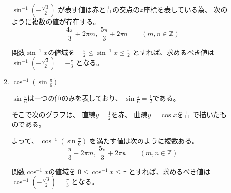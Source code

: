 \documentclass[12pt,b5paper]{ltjsarticle}
\begin{document}
\begin{enumerate}
\begin{enumerate}
            $\displaystyle \sin^{-1}{\left( -\frac{\sqrt{3}}{2} \right)}$
            が表す値は赤と青の交点の$x$座標を表している為、
            次のように複数の値が存在する。
            \begin{equation}
             \frac{4\pi}{3} + 2\pi m, \  \frac{5\pi}{3} + 2\pi n
              \qquad \left( m,n \in \mathbb{Z} \right)
            \end{equation}

            関数$\sin^{-1}{x}$の値域を
            $-\frac{\pi}{2} \leq \sin^{-1}{x} \leq \frac{\pi}{2}$
            とすれば、求めるべき値は
            $\sin^{-1}{\left( -\frac{\sqrt{3}}{2} \right)}=-\frac{\pi}{3}$
            となる。


            \hrulefill

       \item
            $\displaystyle \cos^{-1}{\left( \sin{\frac{\pi}{6}} \right)}$

            \dotfill

            $\displaystyle \sin{\frac{\pi}{6}}$は一つの値のみを表しており、
            $\displaystyle \sin{\frac{\pi}{6}}=\frac{1}{2}$である。

            そこで次のグラフは、
            直線$y=\frac{1}{2}$を赤、
            曲線$y=\cos{x}$を青
            で描いたものである。


            よって、
            $\displaystyle \cos^{-1}{\left( \sin{\frac{\pi}{6}} \right)}$
            を満たす値は次のように複数ある。
            \begin{equation}
             \frac{\pi}{3} + 2\pi m, \  \frac{5\pi}{3} + 2\pi n
              \qquad \left( m,n \in \mathbb{Z} \right)
            \end{equation}

            関数$\cos^{-1}{x}$の値域を
            $0 \leq \cos^{-1}{x} \leq \pi$
            とすれば、求めるべき値は
            $\cos^{-1}{\left( -\frac{\sqrt{3}}{2} \right)}=\frac{\pi}{3}$
            となる。



            \hrulefill


\end{enumerate}
\end{enumerate}
\end{document}
